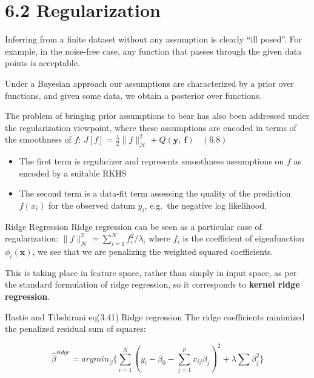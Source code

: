 \documentclass[
  ignorenonframetext,
]{beamer}
\begin{document}
\hypertarget{regularization}{%
\section{6.2 Regularization}\label{regularization}}

\begin{frame}{}
\protect\hypertarget{section-4}{}
Inferring from a finite dataset without any assumption is clearly ``ill
posed''. For example, in the noise-free case, any function that passes
through the given data points is acceptable.

Under a Bayesian approach our assumptions are characterized by a prior
over functions, and given some data, we obtain a posterior over
functions.

The problem of bringing prior assumptions to bear has also been
addressed under the regularization viewpoint, where these assumptions
are encoded in terms of the smoothness of \(f\):
\(J[f] = \frac \lambda 2 \|f\|^2_{\mathcal H} + Q(\pmb y,\ \pmb f)\ \ \ \ (6.8)\)

\begin{itemize}
\item
  The first term is regularizer and represents smoothness assumptions on
  \(f\) as encoded by a suitable RKHS
\item
  The second term is a data-fit term assessing the quality of the
  prediction \(f(x_i)\) for the observed datum \(y_i\), e.g.~the
  negative log likelihood.
\end{itemize}
\end{frame}

\begin{frame}{Ridge Regression}
\protect\hypertarget{ridge-regression}{}
Ridge regression can be seen as a particular case of regularization:
\(\|f\|^2_{\mathcal H} = \sum^N_{i=1}f_i^2/\lambda_i\) where \(f_i\) is
the coefficient of eigenfunction \(\phi_i(\pmb x)\), we see that we are
penalizing the weighted squared coefficients.

This is taking place in feature space, rather than simply in input
space, as per the standard formulation of ridge regression, so it
corresponds to \textbf{kernel ridge regression}.

\begin{block}{Hastie and Tibshirani eq(3.41) Ridge regression}
\protect\hypertarget{hastie-and-tibshirani-eq3.41-ridge-regression}{}
The ridge coefficients minimized the penalized residual sum of squares:

\[
\hat \beta^{ridge} ={argmin}_{\beta} \bigg\{\sum_{i=1}^N(y_i - \beta_0 - \sum_{j=1}^px_{ij}\beta_j)^2 + \lambda\sum\beta_j^2 \bigg\}
\]
\end{block}
\end{frame}
\end{document}
